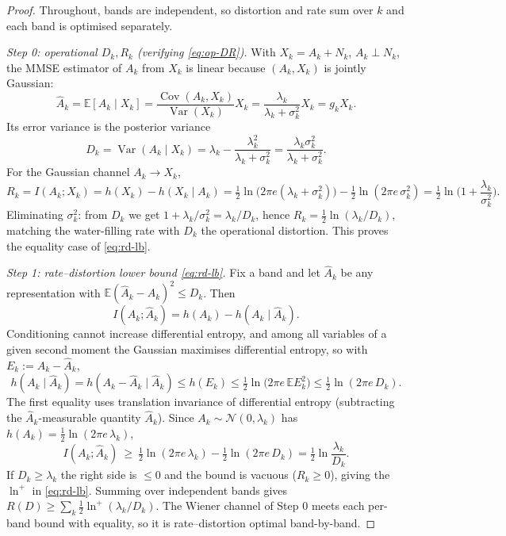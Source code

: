 \begin{proof}
Throughout, bands are independent, so distortion and rate sum over $k$ and each band is optimised separately.

\medskip
\noindent\emph{Step 0: operational $D_k,R_k$ (verifying \eqref{eq:op-DR}).}
With $X_k=A_k+N_k$, $A_k\perp N_k$, the MMSE estimator of $A_k$ from $X_k$ is linear because $(A_k,X_k)$ is jointly Gaussian:
\[
\hat A_k=\mathbb E[A_k\mid X_k]=\frac{\operatorname{Cov}(A_k,X_k)}{\operatorname{Var}(X_k)}X_k=\frac{\lambda_k}{\lambda_k+\sigma_k^2}X_k=g_kX_k .
\]
Its error variance is the posterior variance
\[
D_k=\operatorname{Var}(A_k\mid X_k)=\lambda_k-\frac{\lambda_k^2}{\lambda_k+\sigma_k^2}=\frac{\lambda_k\sigma_k^2}{\lambda_k+\sigma_k^2}.
\]
For the Gaussian channel $A_k\to X_k$,
\[
R_k=I(A_k;X_k)=h(X_k)-h(X_k\mid A_k)=\tfrac12\ln\!\big(2\pi e(\lambda_k+\sigma_k^2)\big)-\tfrac12\ln(2\pi e\,\sigma_k^2)=\tfrac12\ln\!\Big(1+\frac{\lambda_k}{\sigma_k^2}\Big).
\]
Eliminating $\sigma_k^2$: from $D_k$ we get $1+\lambda_k/\sigma_k^2=\lambda_k/D_k$, hence $R_k=\tfrac12\ln(\lambda_k/D_k)$, matching the water-filling rate with $D_k$ the operational distortion. This proves the equality case of \eqref{eq:rd-lb}.

\medskip
\noindent\emph{Step 1: rate--distortion lower bound \eqref{eq:rd-lb}.}
Fix a band and let $\hat A_k$ be any representation with $\mathbb E(\hat A_k-A_k)^2\le D_k$. Then
\[
I(A_k;\hat A_k)=h(A_k)-h(A_k\mid \hat A_k).
\]
Conditioning cannot increase differential entropy, and among all variables of a given second moment the Gaussian maximises differential entropy, so with $E_k:=A_k-\hat A_k$,
\[
h(A_k\mid\hat A_k)=h(A_k-\hat A_k\mid\hat A_k)\le h(E_k)\le\tfrac12\ln\!\big(2\pi e\,\mathbb E E_k^2\big)\le\tfrac12\ln(2\pi e\,D_k).
\]
The first equality uses translation invariance of differential entropy (subtracting the $\hat A_k$-measurable quantity $\hat A_k$). Since $A_k\sim\mathcal N(0,\lambda_k)$ has $h(A_k)=\tfrac12\ln(2\pi e\,\lambda_k)$,
\[
I(A_k;\hat A_k)\ \ge\ \tfrac12\ln(2\pi e\,\lambda_k)-\tfrac12\ln(2\pi e\,D_k)=\tfrac12\ln\frac{\lambda_k}{D_k}.
\]
If $D_k\ge\lambda_k$ the right side is $\le0$ and the bound is vacuous ($R_k\ge0$), giving the $\ln^{+}$ in \eqref{eq:rd-lb}. Summing over independent bands gives $R(D)\ge\sum_k\tfrac12\ln^{+}(\lambda_k/D_k)$. The Wiener channel of Step 0 meets each per-band bound with equality, so it is rate--distortion optimal band-by-band.


\end{proof}
